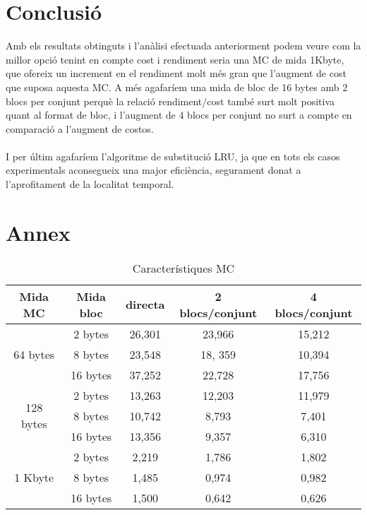 \documentclass{article}
\begin{document}
\section{Conclusió}
Amb els resultats obtinguts i l'anàlisi efectuada anteriorment podem
veure com la millor opció tenint en compte cost
i rendiment seria una MC de mida 1Kbyte, que ofereix
un increment en el rendiment molt més gran que l'augment
de cost que suposa aquesta MC. A més agafaríem una mida
de bloc de 16 bytes amb 2 blocs per conjunt perquè
la relació rendiment/cost també surt molt positiva quant al format
de bloc, i l'augment de 4 blocs per conjunt
no surt a compte en comparació a l'augment de costos.\\
\\
I per últim agafaríem l'algoritme de substitució LRU, ja que
en tots els casos experimentals aconsegueix una major eficiència,
segurament donat a l'aprofitament de la localitat temporal.
\newpage
\section{Annex}
\begin{table}[!h]
\centering
\begin{tabular}{ |c|c|c|c|c| }
\hline
Mida MC& Mida bloc& directa& 2 blocs/conjunt& 4 blocs/conjunt \\
\hline
\multirow{3}{4em}{64 bytes} & 2 bytes & 26,301 & 23,966 & 15,212 \\
& 8 bytes & 23,548 & 18, 359 & 10,394 \\
& 16 bytes & 37,252 & 22,728 & 17,756 \\
\hline
\multirow{3}{4em}{128 bytes} & 2 bytes & 13,263 & 12,203 & 11,979 \\
& 8 bytes & 10,742 & 8,793 & 7,401 \\
& 16 bytes & 13,356 & 9,357 & 6,310 \\
\hline
\multirow{3}{4em}{1 Kbyte} & 2 bytes & 2,219 & 1,786 & 1,802 \\
& 8 bytes & 1,485 & 0,974 & 0,982 \\
& 16 bytes & 1,500 & 0,642 & 0,626 \\
\hline
\end{tabular}
\caption{Característiques MC}
\label{tab:mc}
\end{table}
\end{document}
